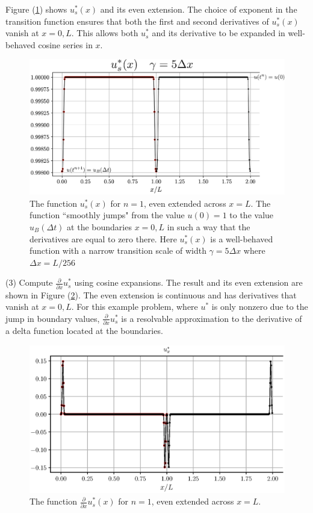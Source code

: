 \documentclass{jfm}
\begin{document}
Figure (\ref{fig:smooth_ustar}) shows $u_s^*(x)$ and its even extension.	The choice of exponent in the transition function ensures that both the first and second derivatives of $u_s^*(x)$ vanish at $x=0,L$. This allows both $u_s^*$ and its derivative
to be expanded in well-behaved cosine series in $x$.
 \begin{figure}
  \centerline{\includegraphics[width=1.0\textwidth]{FIGS/explicit_1step/ustar_vecs.eps}}
  \caption{The function $u_s^*(x)$ for $n=1$, even extended across $x=L$. The function ``smoothly jumps" from the value $u(0)=1$ to the value $u_B(\Delta t)$ at the boundaries $x=0,L$ in such a way that the derivatives are equal to zero there. 
  Here $u_s^*(x)$ is a well-behaved function with a narrow transition scale  of width $\gamma=5\Delta x$ where $\Delta x = L/256$ }
  \label{fig:smooth_ustar}
\end{figure}
\vspace{24pt}

\noindent(3) Compute $ \frac{\partial}{\partial x} u_s^*$ using cosine expansions. The result and its even extension are shown in Figure (\ref{fig:divustar}).
The even extension is continuous and has derivatives that vanish at $x=0,L$. For this example problem, where $u^*$ is only nonzero due to the jump in boundary values,  $ \frac{\partial}{\partial x} u_s^*$ is a resolvable approximation
to the derivative of a delta function located at the boundaries.
 \begin{figure}
  \centerline{\includegraphics[width=1.0\textwidth]{FIGS/explicit_1step/rhs_vecs.eps}}
  \caption{The function $\frac{\partial}{\partial x} u_s^*(x)$ for $n=1$, even extended across $x=L$. 
   }
  \label{fig:divustar}
\end{figure}
\vspace{24pt}
\end{document}
